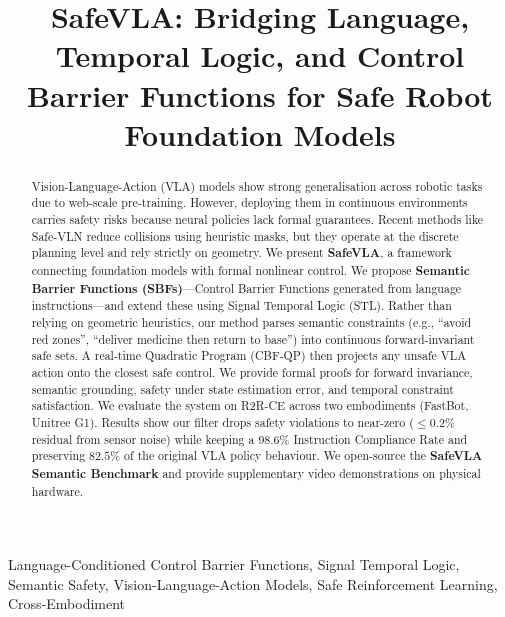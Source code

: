 \documentclass[conference]{IEEEtran}
\begin{document}
\title{SafeVLA: Bridging Language, Temporal Logic, and Control Barrier Functions for Safe Robot Foundation Models}

\author{
}

\maketitle

\begin{abstract}
Vision-Language-Action (VLA) models show strong generalisation across robotic tasks due to web-scale pre-training. However, deploying them in continuous environments carries safety risks because neural policies lack formal guarantees. Recent methods like Safe-VLN reduce collisions using heuristic masks, but they operate at the discrete planning level and rely strictly on geometry. We present \textbf{SafeVLA}, a framework connecting foundation models with formal nonlinear control. We propose \textbf{Semantic Barrier Functions (SBFs)}---Control Barrier Functions generated from language instructions---and extend these using Signal Temporal Logic (STL). Rather than relying on geometric heuristics, our method parses semantic constraints (e.g., ``avoid red zones'', ``deliver medicine then return to base'') into continuous forward-invariant safe sets. A real-time Quadratic Program (CBF-QP) then projects any unsafe VLA action onto the closest safe control. We provide formal proofs for forward invariance, semantic grounding, safety under state estimation error, and temporal constraint satisfaction. We evaluate the system on R2R-CE across two embodiments (FastBot, Unitree G1). Results show our filter drops safety violations to near-zero ($\le 0.2\%$ residual from sensor noise) while keeping a $98.6\%$ Instruction Compliance Rate and preserving $82.5\%$ of the original VLA policy behaviour. We open-source the \textbf{SafeVLA Semantic Benchmark} and provide supplementary video demonstrations on physical hardware.
\end{abstract}

\begin{IEEEkeywords}
Language-Conditioned Control Barrier Functions, Signal Temporal Logic, Semantic Safety, Vision-Language-Action Models, Safe Reinforcement Learning, Cross-Embodiment
\end{IEEEkeywords}
\end{document}

